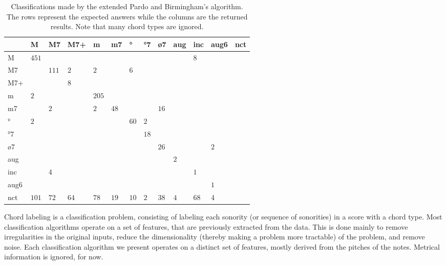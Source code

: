 \documentclass{article}
\begin{document}
\begin{table*}
\centering
\begin{tabular}{l||p{0.55cm}|p{0.55cm}|p{0.55cm}|p{0.55cm}|p{0.55cm}|p{0.55cm}|p{0.55cm}|p{0.55cm}|p{0.55cm}|p{0.55cm}|p{0.55cm}|p{0.55cm}|}
      &     M &    M7 &   M7+ &     m &    m7 &    ° &   °7 &   ø7 &   aug &   inc &  aug6 &   nct  \\  \hline\hline
    M & $ 451 $& $ $& $ $& $ $& $ $& $ $& $ $& $ $& $ $& $   8 $& $ $& $ $ \\ 
   M7 & $ $& $ 111 $& $   2 $& $   2 $& $ $& $   6 $& $ $& $ $& $ $& $ $& $ $& $ $ \\ \hline
  M7+ & $ $& $ $& $   8 $& $ $& $ $& $ $& $ $& $ $& $ $& $ $& $ $& $ $ \\ \hline
    m & $   2 $& $ $& $ $& $ 205 $& $ $& $ $& $ $& $ $& $ $& $ $& $ $& $ $ \\ \hline
   m7 & $ $& $   2 $& $ $& $   2 $& $  48 $& $ $& $ $& $  16 $& $ $& $ $& $ $& $ $ \\ \hline
   ° & $   2 $& $ $& $ $& $ $& $ $& $  60 $& $   2 $& $ $& $ $& $ $& $ $& $ $ \\ \hline
  °7 & $ $& $ $& $ $& $ $& $ $& $ $& $  18 $& $ $& $ $& $ $& $ $& $ $ \\ \hline
  ø7 & $ $& $ $& $ $& $ $& $ $& $ $& $ $& $  26 $& $ $& $ $& $   2 $& $ $ \\ \hline
  aug & $ $& $ $& $ $& $ $& $ $& $ $& $ $& $ $& $   2 $& $ $& $ $& $ $ \\ \hline
  inc & $ $& $   4 $& $ $& $ $& $ $& $ $& $ $& $ $& $ $& $   1 $& $ $& $ $ \\ \hline
 aug6 & $ $& $ $& $ $& $ $& $ $& $ $& $ $& $ $& $ $& $ $& $   1 $& $ $ \\ \hline
  nct & $ 101 $& $  72 $& $  64 $& $  78 $& $  19 $& $  10 $& $   2 $& $  38 $& $   4 $& $  68 $& $   4 $& $ $ \\ \hline
\end{tabular}


\caption{Classifications made by the extended Pardo and Birmingham's algorithm. The rows represent
  the expected answers while the columns are the returned
  results. Note that many chord types are ignored.}
\label{tab:erros-es-pb}
\end{table*}

Chord labeling is a classification problem, consisting of labeling
each sonority (or sequence of sonorities) in a score with a chord
type. Most classification algorithms operate on a set of features,
that are previously extracted from the data. This is done mainly to
remove irregularities in the original inputs, reduce the
dimensionality (thereby making a problem more tractable) of the
problem, and remove noise. Each classification algorithm we present
operates on a distinct set of features, mostly derived from the
pitches of the notes. Metrical information is ignored, for now.
\end{document}
